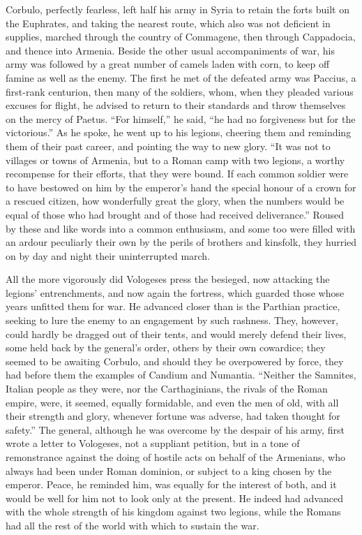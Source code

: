 
Corbulo, perfectly fearless, left half his army in Syria to retain the forts built on the Euphrates, and taking the nearest route, which also was not deficient in supplies, marched through the country of Commagene, then through Cappadocia, and thence into Armenia. Beside the other usual accompaniments of war, his army was followed by a great number of camels laden with corn, to keep off famine as well as the enemy. The first he met of the defeated army was Paccius, a first-rank centurion, then many of the soldiers, whom, when they pleaded various excuses for flight, he advised to return to their standards and throw themselves on the mercy of Paetus. ``For himself,'' he said, ``he had no forgiveness but for the victorious.'' As he spoke, he went up to his legions, cheering them and reminding them of their past career, and pointing the way to new glory. ``It was not to villages or towns of Armenia, but to a Roman camp with two legions, a worthy recompense for their efforts, that they were bound. If each common soldier were to have bestowed on him by the emperor's hand the special honour of a crown for a rescued citizen, how wonderfully great the glory, when the numbers would be equal of those who had brought and of those had received deliverance.'' Roused by these and like words into a common enthusiasm, and some too were filled with an ardour peculiarly their own by the perils of brothers and kinsfolk, they hurried on by day and night their uninterrupted march.


All the more vigorously did Vologeses press the besieged, now attacking the legions' entrenchments, and now again the fortress, which guarded those whose years unfitted them for war. He advanced closer than is the Parthian practice, seeking to lure the enemy to an engagement by such rashness. They, however, could hardly be dragged out of their tents, and would merely defend their lives, some held back by the general's order, others by their own cowardice; they seemed to be awaiting Corbulo, and should they be overpowered by force, they had before them the examples of Candium and Numantia. ``Neither the Samnites, Italian people as they were, nor the Carthaginians, the rivals of the Roman empire, were, it seemed, equally formidable, and even the men of old, with all their strength and glory, whenever fortune was adverse, had taken thought for safety.'' The general, although he was overcome by the despair of his army, first wrote a letter to Vologeses, not a suppliant petition, but in a tone of remonstrance against the doing of hostile acts on behalf of the Armenians, who always had been under Roman dominion, or subject to a king chosen by the emperor. Peace, he reminded him, was equally for the interest of both, and it would be well for him not to look only at the present. He indeed had advanced with the whole strength of his kingdom against two legions, while the Romans had all the rest of the world with which to sustain the war.


